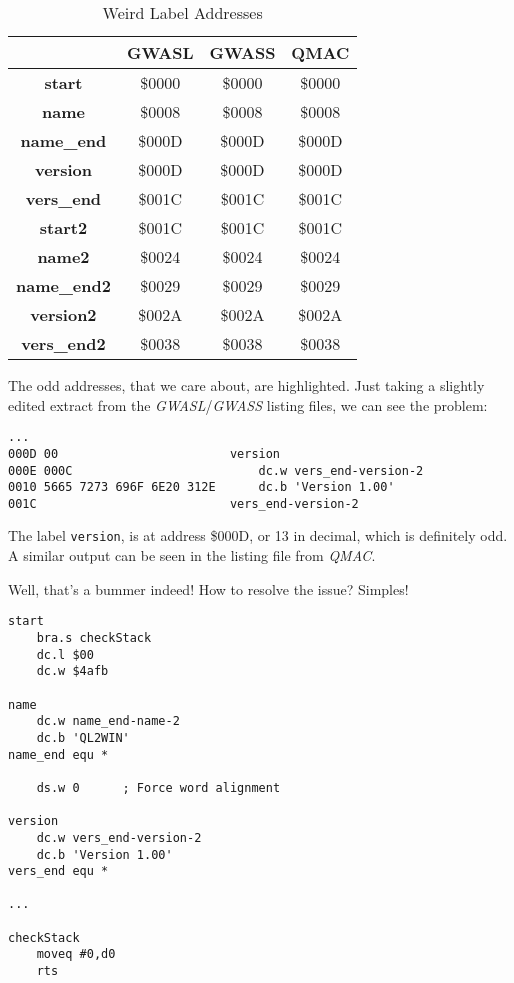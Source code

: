 \begin{table}[!h]
\begin{centering}
\begin{tabular}{|c|c|c|c|}
\hline 
 & \textbf{GWASL} & \textbf{GWASS} & \textbf{QMAC}\tabularnewline
\hline 
\hline 
\textbf{start} & \$0000 & \$0000 & \$0000\tabularnewline
\hline 
\textbf{name} & \$0008 & \$0008 & \$0008\tabularnewline
\hline 
\textbf{name\_end} & \$000D & \$000D & \$000D\tabularnewline
\hline 
\textbf{version} & \cellcolor{red}\$000D & \cellcolor{red}\$000D & \cellcolor{red}\$000D\tabularnewline
\hline 
\textbf{vers\_end} & \$001C & \$001C & \$001C\tabularnewline
\hline 
\hline 
\textbf{start2} & \$001C & \$001C & \$001C\tabularnewline
\hline 
\textbf{name2} & \$0024 & \$0024 & \$0024\tabularnewline
\hline 
\textbf{name\_end2} & \$0029 & \$0029 & \$0029\tabularnewline
\hline 
\textbf{version2} & \$002A & \$002A & \$002A\tabularnewline
\hline 
\textbf{vers\_end2} & \$0038 & \$0038 & \$0038\tabularnewline
\hline 
\end{tabular}
\par\end{centering}
\caption{Weird Label Addresses\label{tab:Weird-Label-Addresses}}

\end{table}

The odd addresses, that we care about, are highlighted. Just taking
a slightly edited extract from the \emph{GWASL}/\emph{GWASS} listing
files, we can see the problem:

\begin{lstlisting}
...
000D 00                        version
000E 000C                          dc.w vers_end-version-2
0010 5665 7273 696F 6E20 312E      dc.b 'Version 1.00'
001C                           vers_end-version-2
\end{lstlisting}

The label \texttt{version}, is at address \$000D, or 13 in decimal,
which is definitely odd. A similar output can be seen in the listing
file from \emph{QMAC}.

Well, that's a bummer indeed! How to resolve the issue? Simples!

\begin{lstlisting}
start
    bra.s checkStack
    dc.l $00
    dc.w $4afb

name
    dc.w name_end-name-2
    dc.b 'QL2WIN'
name_end equ *

	ds.w 0		; Force word alignment

version
    dc.w vers_end-version-2
    dc.b 'Version 1.00'
vers_end equ *

...

checkStack
    moveq #0,d0
    rts
\end{lstlisting}

